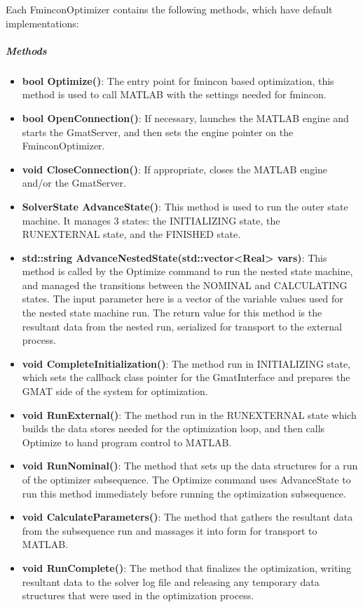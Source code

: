 Each FminconOptimizer contains the following methods, which have default implementations:

\subparagraph{\textit{Methods}}
\begin{itemize}
\item \textbf{bool Optimize()}:  The entry point for fmincon based optimization, this method is
used to call MATLAB with the settings needed for fmincon.
\item \textbf{bool OpenConnection()}: If necessary, launches the MATLAB engine and starts the
GmatServer, and then sets the engine pointer on the FminconOptimizer.
\item \textbf{void CloseConnection()}: If appropriate, closes the MATLAB engine and/or the
GmatServer.
\item \textbf{SolverState AdvanceState()}: This method is used to run the outer state machine. It
manages 3 states: the INITIALIZING state, the RUNEXTERNAL state, and the FINISHED state.
\item \textbf{std::string AdvanceNestedState(std::vector<Real> vars)}: This method is called by the
Optimize command to run the nested state machine, and managed the transitions between the NOMINAL
and CALCULATING states.  The input parameter here is a vector of the variable values used for the
nested state machine run.  The return value for this method is the resultant data from the nested
run, serialized for transport to the external process.
\item \textbf{void CompleteInitialization()}:  The method run in INITIALIZING state, which sets the
callback class pointer for the GmatInterface and prepares the GMAT side of the system for
optimization.
\item \textbf{void RunExternal()}: The method run in the RUNEXTERNAL state which builds the data
stores needed for the optimization loop, and then calls Optimize to hand program control to MATLAB.
\item \textbf{void RunNominal()}:  The method that sets up the data structures for a run of the
optimizer subsequence.  The Optimize command uses AdvanceState to run this method immediately before
running the optimization subsequence.
\item \textbf{void CalculateParameters()}:  The method that gathers the resultant data from the
subsequence run and massages it into form for transport to MATLAB.
\item \textbf{void RunComplete()}:  The method that finalizes the optimization, writing resultant
data to the solver log file and releasing any temporary data structures that were used in the
optimization process.
\end{itemize}

